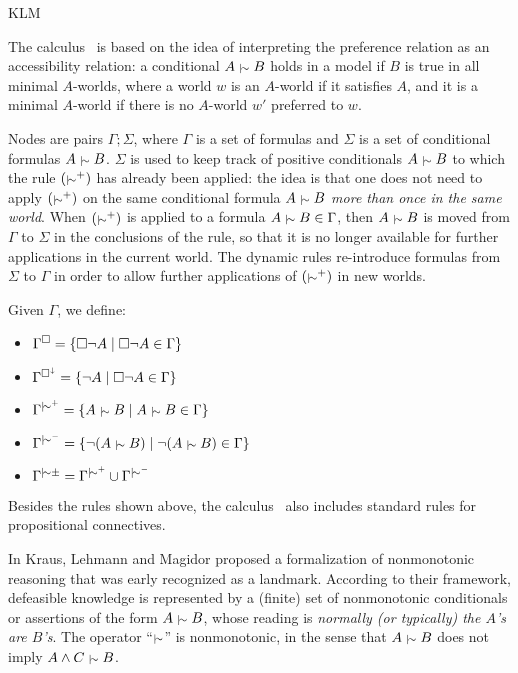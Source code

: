 \begin{entry}{KLM}
\begin{clarifications}
The calculus \calcoloP \ is based on the idea of interpreting the preference relation as an
accessibility relation: a conditional $A \mathrel{{\scriptstyle\mid\!\sim}} B$ holds in a model
if  $B$ is true in all minimal $A$-worlds, where a world $w$ is an $A$-world if it satisfies $A$, and it is a minimal $A$-world if there is no $A$-world $w'$ preferred to $w$.  

Nodes are pairs $\Gamma;
\Sigma$, where $\Gamma$ is a set of formulas and $\Sigma$ is a set
of conditional formulas $A \mathrel{{\scriptstyle\mid\!\sim}} B$. $\Sigma$ is used to keep
track of positive conditionals $A \mathrel{{\scriptstyle\mid\!\sim}} B$ to which the rule
$(\mathrel{{\scriptstyle\mid\!\sim}}^{+})$ has already been applied: the idea
is that one does not need to apply $(\mathrel{{\scriptstyle\mid\!\sim}}^{+})$ on the same
conditional formula $A \mathrel{{\scriptstyle\mid\!\sim}} B$ \emph{more than once in the same
world}. When $(\mathrel{{\scriptstyle\mid\!\sim}}^{+})$ is applied to a formula $A \mathrel{{\scriptstyle\mid\!\sim}} B \in \Gamma$, then $A \mathrel{{\scriptstyle\mid\!\sim}} B$ is moved from $\Gamma$ to $\Sigma$ in the conclusions of the rule, so that it is no longer available for further applications in the current world.
The dynamic rules re-introduce formulas from $\Sigma$ to $\Gamma$ in order to
allow further applications of $(\mathrel{{\scriptstyle\mid\!\sim}}^{+})$ in new  worlds.

Given $\Gamma$, we define:
\begin{itemize}
   \item $\Gamma^{\square}=\{ \square \lnot A \mid \square \lnot A \in \Gamma
    \}$
    \item $\Gamma^{\square^{\downarrow}}=\{ \lnot A \mid \square \lnot A \in \Gamma \}$
  \item     $\Gamma^{\mathrel{{\scriptstyle\mid\!\sim}}^{+}}=\{A \mathrel{{\scriptstyle\mid\!\sim}} B \mid A \mathrel{{\scriptstyle\mid\!\sim}} B \in
    \Gamma\}$
  \item     $\Gamma^{\mathrel{{\scriptstyle\mid\!\sim}}^{-}}=\{\lnot(A \mathrel{{\scriptstyle\mid\!\sim}} B) \mid \lnot(A \mathrel{{\scriptstyle\mid\!\sim}} B) \in
    \Gamma\}$
  \item     $\Gamma^{\mathrel{{\scriptstyle\mid\!\sim}}\pm}=\Gamma^{\mathrel{{\scriptstyle\mid\!\sim}}^{+}} \cup \Gamma^{\mathrel{{\scriptstyle\mid\!\sim}}^{-}}$
  \end{itemize}

Besides the rules shown above, the calculus \calcoloP \ also includes standard 
   rules for propositional connectives.
\end{clarifications}

 \begin{history}
 In \cite{KrausLehmannMagidor:90} Kraus, Lehmann and
Magidor proposed a formalization of nonmonotonic
reasoning that was early recognized as a landmark. According to their framework, defeasible knowledge is
represented by a  (finite) set of nonmonotonic conditionals or
assertions of the form
$A \mathrel{{\scriptstyle\mid\!\sim}} B$, whose reading is \emph{normally (or typically) the $A$'s
are $B$'s}. The operator ``$\mathrel{{\scriptstyle\mid\!\sim}}$'' is nonmonotonic, in the sense
that $A \mathrel{{\scriptstyle\mid\!\sim}} B$ does not imply $A \land C \mathrel{{\scriptstyle\mid\!\sim}} B$. 
 

\end{history}
\end{entry}
